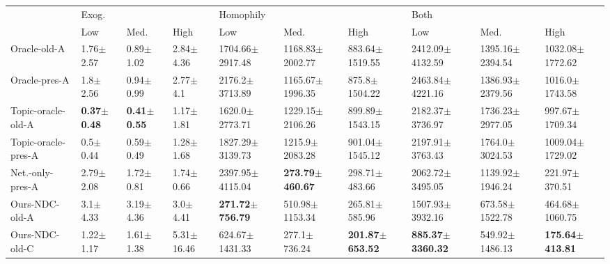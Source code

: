 \begin{tabular}{llllllllll}
\toprule
{} & \multicolumn{3}{l}{Exog.} & \multicolumn{3}{l}{Homophily} & \multicolumn{3}{l}{Both} \\
{} &                     Low &                    Med. &                    High &                         Low &                        Med. &                        High &                          Low &                        Med. &                        High \\
\midrule
Oracle-old-A        &           1.76$\pm$2.57 &           0.89$\pm$1.02 &           2.84$\pm$4.36 &         1704.66$\pm$2917.48 &         1168.83$\pm$2002.77 &          883.64$\pm$1519.55 &          2412.09$\pm$4132.59 &         1395.16$\pm$2394.54 &         1032.08$\pm$1772.62 \\
Oracle-pres-A       &            1.8$\pm$2.56 &           0.94$\pm$0.99 &            2.77$\pm$4.1 &          2176.2$\pm$3713.89 &         1165.67$\pm$1996.35 &           875.8$\pm$1504.22 &          2463.84$\pm$4221.16 &         1386.93$\pm$2379.56 &          1016.0$\pm$1743.58 \\
Topic-oracle-old-A  &  \textbf{0.37$\pm$0.48} &  \textbf{0.41$\pm$0.55} &           1.17$\pm$1.81 &          1620.0$\pm$2773.71 &         1229.15$\pm$2106.26 &          899.89$\pm$1543.15 &          2182.37$\pm$3736.97 &         1736.23$\pm$2977.05 &          997.67$\pm$1709.34 \\
Topic-oracle-pres-A &            0.5$\pm$0.44 &           0.59$\pm$0.49 &           1.28$\pm$1.68 &         1827.29$\pm$3139.73 &          1215.9$\pm$2083.28 &          901.04$\pm$1545.12 &          2197.91$\pm$3763.43 &          1764.0$\pm$3024.53 &         1009.04$\pm$1729.02 \\
Net.-only-pres-A    &           2.79$\pm$2.08 &           1.72$\pm$0.81 &           1.74$\pm$0.66 &         2397.95$\pm$4115.04 &  \textbf{273.79$\pm$460.67} &           298.71$\pm$483.66 &          2062.72$\pm$3495.05 &         1139.92$\pm$1946.24 &           221.97$\pm$370.51 \\
Ours-NDC-old-A      &            3.1$\pm$4.33 &           3.19$\pm$4.36 &            3.0$\pm$4.41 &  \textbf{271.72$\pm$756.79} &          510.98$\pm$1153.34 &           265.81$\pm$585.96 &          1507.93$\pm$3932.16 &          673.58$\pm$1522.78 &          464.68$\pm$1060.75 \\
Ours-NDC-old-C      &           1.22$\pm$1.17 &           1.61$\pm$1.38 &          5.31$\pm$16.46 &          624.67$\pm$1431.33 &            277.1$\pm$736.24 &  \textbf{201.87$\pm$653.52} &  \textbf{885.37$\pm$3360.32} &          549.92$\pm$1486.13 &  \textbf{175.64$\pm$413.81} \\

\end{tabular}
